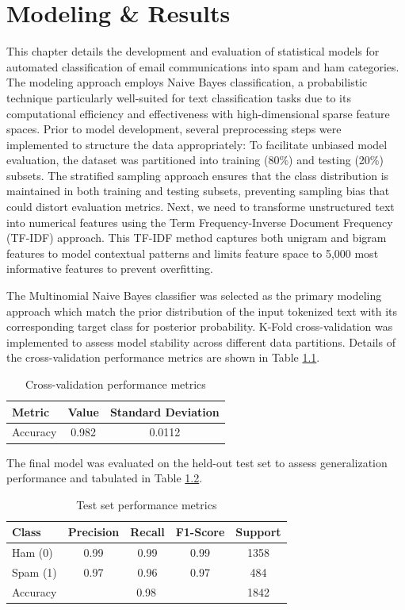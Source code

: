 \chapter{Modeling \& Results}

This chapter details the development and evaluation of statistical models for automated classification of email communications into spam and ham categories. The modeling approach employs Naive Bayes classification, a probabilistic technique particularly well-suited for text classification tasks due to its computational efficiency and effectiveness with high-dimensional sparse feature spaces.
Prior to model development, several preprocessing steps were implemented to structure the data appropriately: To facilitate unbiased model evaluation, the dataset was partitioned into training (80\%)  and testing (20\%) subsets.
The stratified sampling approach ensures that the class distribution is maintained in both training and testing subsets, preventing sampling bias that could distort evaluation metrics.
Next, we need to transforme unstructured text into numerical features using the Term Frequency-Inverse Document Frequency (TF-IDF) approach. This TF-IDF method captures both unigram and bigram features to model contextual patterns and limits feature space to 5,000 most informative features to prevent overfitting.

The Multinomial Naive Bayes classifier was selected as the primary modeling approach which match the prior distribution of the input tokenized text with its corresponding target class for posterior probability. 
K-Fold cross-validation was implemented to assess model stability across different data partitions.
Details of the cross-validation performance metrics are shown in Table \ref{tab:cv_metrics}.

\begin{table}[H]
\centering
\caption{Cross-validation performance metrics}
\label{tab:cv_metrics}
\begin{tabular}{lcc}
\toprule
\textbf{Metric} & \textbf{Value} & \textbf{Standard Deviation} \\
\midrule
Accuracy & 0.982 & 0.0112 \\
\bottomrule
\end{tabular}
\end{table}

The final model was evaluated on the held-out test set to assess generalization performance and tabulated in Table \ref{tab:test_metrics}.

\begin{table}[H]
\centering
\caption{Test set performance metrics}
\label{tab:test_metrics}
\begin{tabular}{lcccc}
\toprule
\textbf{Class} & \textbf{Precision} & \textbf{Recall} & \textbf{F1-Score} & \textbf{Support} \\
\midrule
Ham (0) & 0.99 & 0.99 & 0.99 & 1358 \\
Spam (1) & 0.97 & 0.96 & 0.97 & 484 \\
\midrule
Accuracy & \multicolumn{3}{c}{0.98} & 1842 \\
\bottomrule
\end{tabular}
\end{table}

